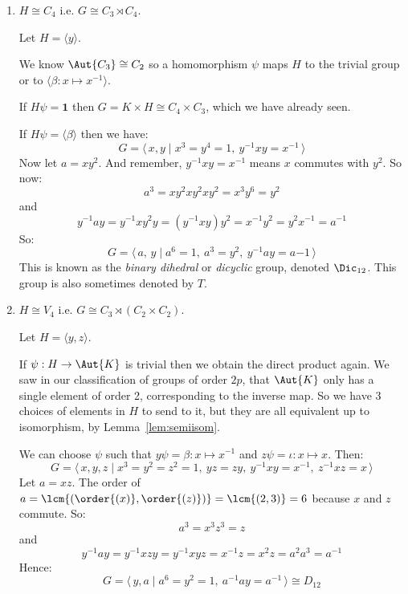 \begin{enumerate}
    \item \(H \cong C_4\) i.e. \(G \cong C_3 \rtimes C_4\).

        Let \(H = \langle y \rangle\).

        We know \(\Aut{C_3} \cong C_2\) so a homomorphism \(\psi\) maps \(H\) to the trivial group or to \(\langle
        \beta:x \mapsto x^{-1} \rangle\).

        If \(H\psi = \bm{1}\) then \(G = K \times H \cong C_4 \times C_3\), which we have already seen.

        If \(H\psi = \langle \beta \rangle\) then we have:
        \[G = \langle\, x, y \mid x^3 = y^4 = 1,\ y^{-1}xy = x^{-1}\,\rangle\]
        Now let \(a = xy^2\).
        And remember, \(y^{-1}xy = x^{-1}\) means \(x\) commutes with \(y^2\).
        So now:
        \[a^3 = xy^2xy^2xy^2 = x^3y^6 = y^2\]
        and
        \[y^{-1}ay = y^{-1}xy^2y = (y^{-1}xy)y^2 = x^{-1}y^2 = y^2x^{-1} = a^{-1}\]
        So:
        \[G = \langle\, a,\,y \mid a^6 = 1,\ a^3 = y^2,\ y^{-1}ay = a{-1}\,\rangle\]
        This is known as the \emph{binary dihedral} or \emph{dicyclic} group, denoted \(\Dic_{12}\).
        This group is also sometimes denoted by \(T\).

    \item \(H \cong V_4\) i.e. \(G \cong C_3 \rtimes (C_2 \times C_2)\).

        Let \(H = \langle y, z \rangle\).

        If \(\psi:H \to \Aut{K}\) is trivial then we obtain the direct product again.
        We saw in our classification of groups of order \(2p\), that \(\Aut{K}\) only has a single element of order 2,
        corresponding to the inverse map.
        So we have 3 choices of elements in \(H\) to send to it, but they are all equivalent up to isomorphism, by
        Lemma~\ref{lem:semiisom}.

        We can choose \(\psi\) such that \(y\psi = \beta:x \mapsto x^{-1}\) and \(z\psi = \iota:x \mapsto x\).
        Then:
        \[G = \langle\, x, y, z \mid x^3 = y^2 = z^2 = 1,\ yz = zy,\ y^{-1}xy = x^{-1},\ z^{-1}xz = x\,\rangle\]
        Let \(a = xz\).
        The order of \(a = \lcm{(\order{(x)}, \order{(z)})} = \lcm{(2, 3)} = 6\) because \(x\) and \(z\) commute.
        So:
        \[a^3 = x^3z^3 = z\]
        and
        \[ y^{-1}ay = y^{-1}xzy = y^{-1}xyz = x^{-1}z = x^2z = a^2a^3 = a^{-1}\]
        Hence:
        \[G = \langle\, y, a \mid a^6 = y^2 = 1,\ a^{-1}ay = a^{-1}\,\rangle
        \cong D_{12}\]
\end{enumerate}

